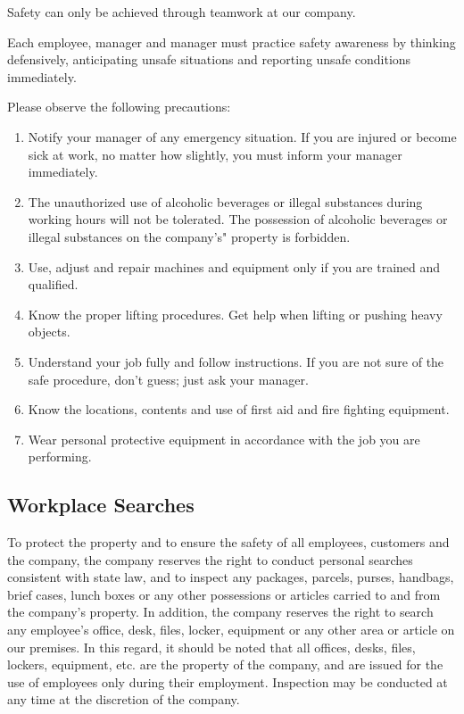 Safety can only be achieved through teamwork at our company.

Each employee, manager and manager must practice safety awareness by thinking defensively, anticipating unsafe situations and reporting unsafe conditions immediately.

Please observe the following precautions:

\begin{enumerate}
		
	\item Notify your manager of any emergency 	situation. If you are injured or become sick at 	work, no matter how slightly, you must inform 	your manager immediately.
	
	\item The unauthorized use of alcoholic beverages or 	illegal substances during working hours will not 	be tolerated. The possession of alcoholic 	beverages or illegal substances on the 	company's" property is forbidden.
	
	\item Use, adjust and repair machines and equipment 	only if you are trained and qualified.
	
	\item Know the proper lifting procedures. Get help 	when lifting or pushing heavy objects.
	
	\item Understand your job fully and follow instructions. 	If you are not sure of the safe procedure, don't 	guess; just ask your manager.
	
	\item Know the locations, contents and use of first aid 	and fire fighting equipment.
	
	\item Wear personal protective equipment in 	accordance with the job you are performing.

\end{enumerate}
	
\subsection{Workplace Searches}

To protect the property and to ensure the safety of all employees, customers and the company, the company reserves the right to conduct personal searches consistent with state law, and to inspect any packages, parcels, purses, handbags, brief cases, lunch boxes or any other possessions or articles carried to and from the company's property. In addition, the company reserves the right to search any employee's office, desk, files, locker, equipment or any other area or article on our premises. In this regard, it should be noted that all offices, desks, files, lockers, equipment, etc. are the property of the company, and are issued for the use of employees only during their employment. Inspection may be conducted at any time at the discretion of the company.

